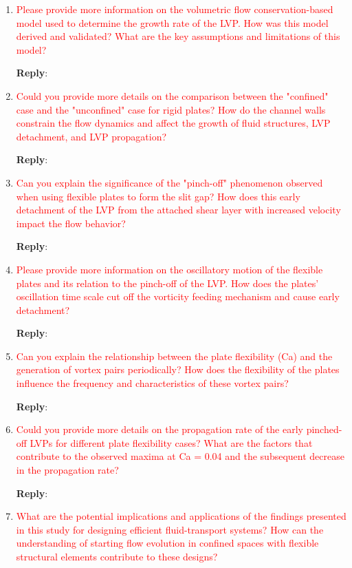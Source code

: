 \documentclass[onecolumn,a4paper,amsmath,amssym,pre]{revtex4}
\begin{document}
{\begin{enumerate}
\textbf{Reply}:

\item \textcolor{red}{Please provide more information on the volumetric flow conservation-based model used to determine the growth rate of the LVP. How was this model derived and validated? What are the key assumptions and limitations of this model?}

\textbf{Reply}:

\item \textcolor{red}{Could you provide more details on the comparison between the "confined" case and the "unconfined" case for rigid plates? How do the channel walls constrain the flow dynamics and affect the growth of fluid structures, LVP detachment, and LVP propagation?}

\textbf{Reply}:

\item \textcolor{red}{Can you explain the significance of the "pinch-off" phenomenon observed when using flexible plates to form the slit gap? How does this early detachment of the LVP from the attached shear layer with increased velocity impact the flow behavior?}

\textbf{Reply}:

\item \textcolor{red}{Please provide more information on the oscillatory motion of the flexible plates and its relation to the pinch-off of the LVP. How does the plates' oscillation time scale cut off the vorticity feeding mechanism and cause early detachment?}

\textbf{Reply}:

\item \textcolor{red}{Can you explain the relationship between the plate flexibility (Ca) and the generation of vortex pairs periodically? How does the flexibility of the plates influence the frequency and characteristics of these vortex pairs?}

\textbf{Reply}:

\item \textcolor{red}{Could you provide more details on the propagation rate of the early pinched-off LVPs for different plate flexibility cases? What are the factors that contribute to the observed maxima at Ca = 0.04 and the subsequent decrease in the propagation rate?}

\textbf{Reply}:

\item \textcolor{red}{What are the potential implications and applications of the findings presented in this study for designing efficient fluid-transport systems? How can the understanding of starting flow evolution in confined spaces with flexible structural elements contribute to these designs?}


\end{enumerate}}
\end{document}
